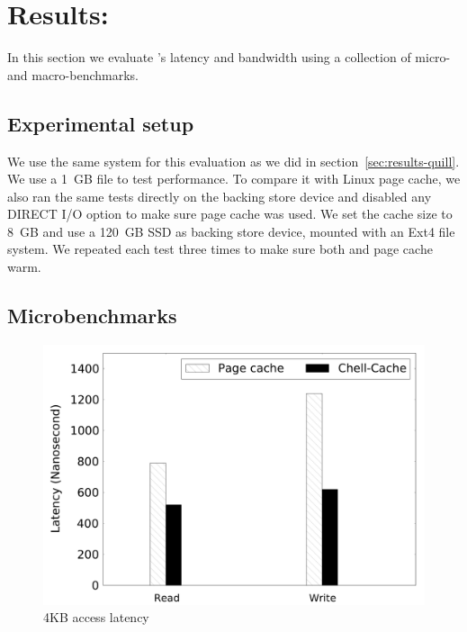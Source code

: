 
\section{Results: \CChell{}}
\label{sec:results-chell}

In this section we evaluate \CChell{}'s latency and bandwidth using a
collection of micro- and macro-benchmarks.  


\subsection{Experimental setup}
\label{sec:setup}

We use the same system for this evaluation as we did in
section~\ref{sec:results-quill}. We use a 1~GB file to test
\CChell{} performance. To compare it with Linux page cache, we also ran the
same tests directly on the backing store device and disabled any DIRECT I/O
option to make sure page cache was used.  We set the cache size to 8~GB and use
a 120~GB SSD as backing store device, mounted with an Ext4 file system.  We
repeated each test three times to make sure both \CChell{} and page cache warm.

\subsection{Microbenchmarks}
\label{sec:microbenchmark}

\begin{figure}
\includegraphics[width=\linewidth]{Graphs/latency.pdf}
\centering
\caption{\CChell{} 4KB access latency}
\label{fig:chell-latency}
\end{figure}

